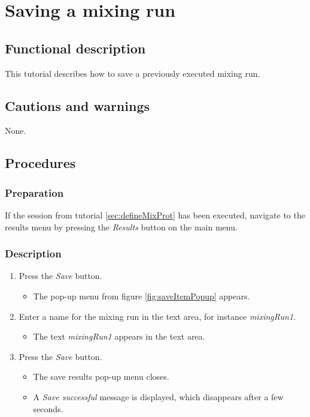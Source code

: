 \section{Saving a mixing run}\label{sec:savmixrun}

\subsection{Functional description}
This tutorial describes how to save a previously executed mixing run.

\subsection{Cautions and warnings}
None.

\subsection{Procedures}

\subsubsection{Preparation}
If the session from tutorial \ref{sec:defineMixProt} has been executed, navigate to the results menu by pressing the \emph{Results} button on the main menu.

\subsubsection{Description}
\begin{enumerate}
	\item Press the \emph{Save} button.
		\begin{itemize}
			\item The pop-up menu from figure \ref{fig:saveItemPopup} appears.
		\end{itemize}
	\item Enter a name for the mixing run in the text area, for instance \emph{mixingRun1}.
		\begin{itemize}
			\item The text \emph{mixingRun1} appears in the text area.
		\end{itemize}
	\item Press the \emph{Save} button. \label{item:savmixrunName}
		\begin{itemize}
			\item The save results pop-up menu closes.
			\item A \emph{Save successful} message is displayed, which disappears after a few seconds.
		\end{itemize}
\end{enumerate}

